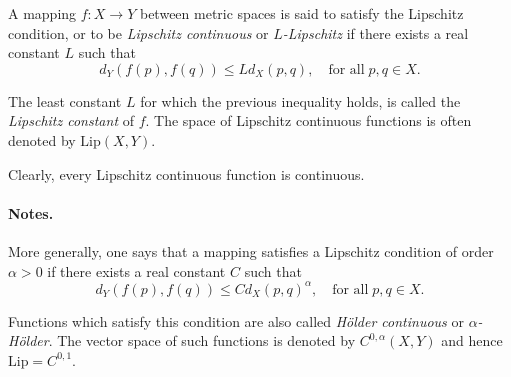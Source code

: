 \documentclass[12pt]{article}
\begin{document}
A mapping $f: X \to Y$ between metric spaces is said to satisfy the
Lipschitz condition, or to be \emph{Lipschitz continuous} or \emph{$L$-Lipschitz} if there exists a real constant $L$ such
that
$$ d_Y(f(p),f(q)) \leq L d_X(p,q),\quad \text{for all}\; p,q\in X.$$

The least constant $L$ for which the previous inequality holds, is called the \emph{Lipschitz constant} of $f$.
The space of Lipschitz continuous functions is often denoted by $\mathrm{Lip}(X,Y)$.

Clearly, every Lipschitz continuous function is continuous.

\paragraph{Notes.}
More generally, one says that a mapping satisfies
a Lipschitz condition of order $\alpha>0$ if there exists a real constant $C$ such that
$$ d_Y(f(p),f(q)) \leq C d_X(p,q)^\alpha,\quad \text{for all}\; p,q\in X.$$

Functions which satisfy this condition are also called \emph{H{\"o}lder continuous} or \emph{$\alpha$-H{\"o}lder}. The vector space of such functions is denoted by $C^{0,\alpha}(X,Y)$ and hence $\mathrm{Lip}=C^{0,1}$.
\end{document}
